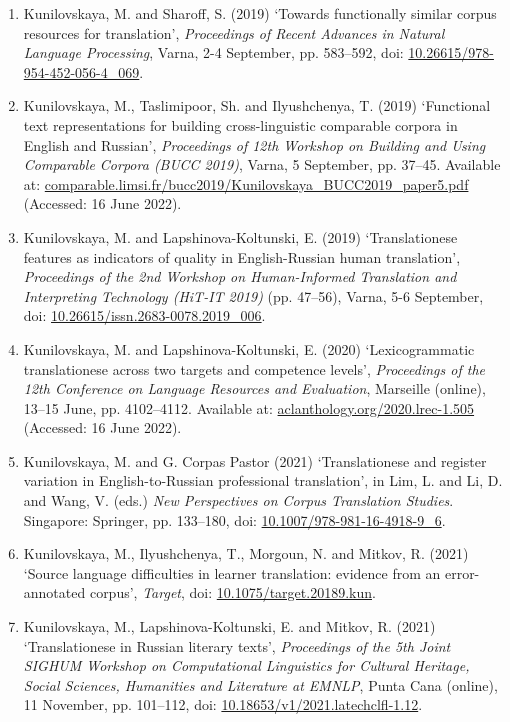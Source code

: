 \begin{enumerate}\compresslist{}
	\item Kunilovskaya, M. and Sharoff, S. (2019) `Towards functionally similar corpus resources for translation', \textit{Proceedings of Recent Advances in Natural Language Processing}, Varna, 2-4 September, pp. 583–592, doi: \url{10.26615/978-954-452-056-4\_069}.
	\item Kunilovskaya, M., Taslimipoor, Sh. and Ilyushchenya, T. (2019) `Functional text representations for building cross-linguistic comparable corpora in English and Russian', \textit{Proceedings of 12th Workshop on Building and Using Comparable Corpora (BUCC 2019)}, Varna, 5 September, pp. 37--45. Available at: \url{comparable.limsi.fr/bucc2019/Kunilovskaya\_BUCC2019\_paper5.pdf} (Accessed: 16 June 2022).
	\item Kunilovskaya, M. and Lapshinova-Koltunski, E. (2019) `Translationese features as indicators of quality in English-Russian human translation', \textit{Proceedings of the 2nd Workshop on Human-Informed Translation and Interpreting Technology (HiT-IT 2019)} (pp. 47–56), Varna, 5-6 September, doi: \url{10.26615/issn.2683-0078.2019\_006}.
	\item Kunilovskaya, M. and Lapshinova-Koltunski, E. (2020) `Lexicogrammatic translationese across two targets and competence levels', \textit{Proceedings of the 12th Conference on Language Resources and Evaluation}, Marseille (online), 13--15 June, pp. 4102–4112. Available at: \url{aclanthology.org/2020.lrec-1.505} (Accessed: 16 June 2022).
	\item Kunilovskaya, M. and G. Corpas Pastor (2021) `Translationese and register variation in English-to-Russian professional translation', in Lim, L. and  Li, D. and Wang, V. (eds.) \textit{New Perspectives on Corpus Translation Studies}. Singapore: Springer, pp. 133--180, doi: \url{10.1007/978-981-16-4918-9\_6}.
	\item Kunilovskaya, M., Ilyushchenya, T., Morgoun, N. and Mitkov, R. (2021) `Source language difficulties in learner translation: evidence from an error-annotated corpus', \textit{Target}, doi: \url{10.1075/target.20189.kun}. 
	\item Kunilovskaya, M., Lapshinova-Koltunski, E. and Mitkov, R. (2021) `Translationese in Russian literary texts', \textit{Proceedings of the 5th Joint SIGHUM Workshop on Computational Linguistics for Cultural Heritage, Social Sciences, Humanities and Literature at EMNLP}, Punta Cana (online), 11 November, pp. 101--112, doi: \url{10.18653/v1/2021.latechclfl-1.12}.
\end{enumerate}


